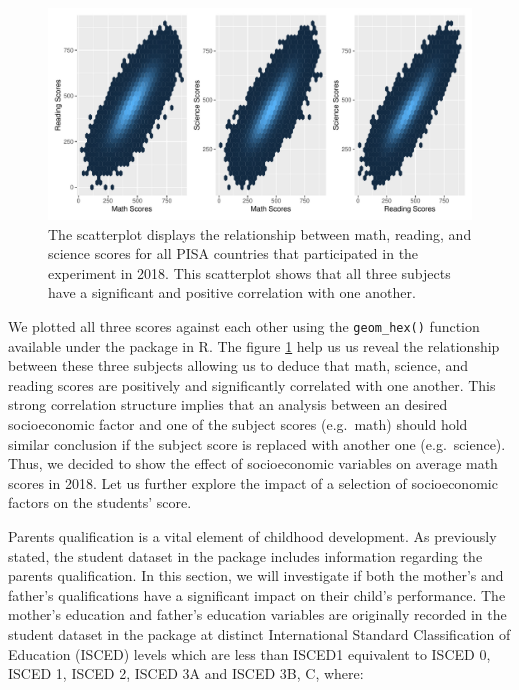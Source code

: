 \begin{Schunk}
\begin{figure}[H]
\includegraphics[width=1\linewidth]{learningtower_files/figure-latex/corr-plot-1} \caption[The scatterplot displays the relationship between math, reading, and science scores for all PISA countries that participated in the experiment in 2018]{The scatterplot displays the relationship between math, reading, and science scores for all PISA countries that participated in the experiment in 2018. This scatterplot shows that all three subjects have a significant and positive correlation with one another.}\label{fig:corr-plot}
\end{figure}
\end{Schunk}

We plotted all three scores against each other using the
\texttt{geom\_hex()} function available under the 
\citep{ggplot2} package in R. The figure \ref{fig:corr-plot} help us us
reveal the relationship between these three subjects allowing us to
deduce that math, science, and reading scores are positively and
significantly correlated with one another. This strong correlation
structure implies that an analysis between an desired socioeconomic
factor and one of the subject scores (e.g.~math) should hold similar
conclusion if the subject score is replaced with another one
(e.g.~science). Thus, we decided to show the effect of socioeconomic
variables on average math scores in 2018. Let us further explore the
impact of a selection of socioeconomic factors on the students' score.

Parents qualification is a vital element of childhood development. As
previously stated, the student dataset in the package includes
information regarding the parents qualification. In this section, we
will investigate if both the mother's and father's qualifications have a
significant impact on their child's performance. The mother's education
and father's education variables are originally recorded in the student
dataset in the  package at distinct International
Standard Classification of Education (ISCED) levels which are less than
ISCED1 equivalent to ISCED 0, ISCED 1, ISCED 2, ISCED 3A and ISCED 3B,
C, where:

